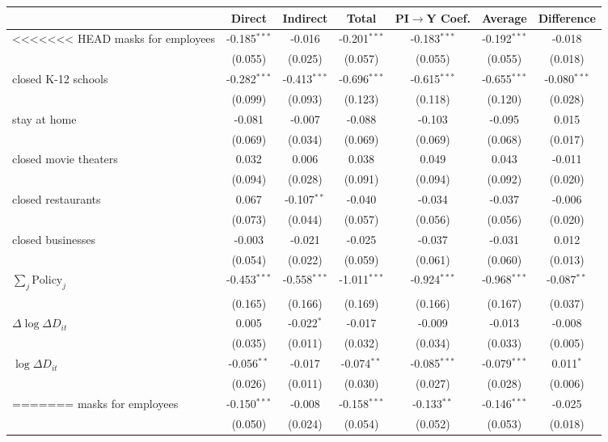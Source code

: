 
\begin{tabular}{lccccc|>{}c}
\toprule
  & Direct & Indirect & Total & PI$\to$Y Coef. & Average & Difference\\
\midrule
<<<<<<< HEAD
masks for employees & -0.185$^{***}$ & -0.016 & -0.201$^{***}$ & -0.183$^{***}$ & -0.192$^{***}$ & -0.018\\
 & (0.055) & (0.025) & (0.057) & (0.055) & (0.055) & (0.018)\\
closed K-12 schools & -0.282$^{***}$ & -0.413$^{***}$ & -0.696$^{***}$ & -0.615$^{***}$ & -0.655$^{***}$ & -0.080$^{***}$\\
 & (0.099) & (0.093) & (0.123) & (0.118) & (0.120) & (0.028)\\
stay at home & -0.081 & -0.007 & -0.088 & -0.103 & -0.095 & 0.015\\
 & (0.069) & (0.034) & (0.069) & (0.069) & (0.068) & (0.017)\\
closed movie theaters & 0.032 & 0.006 & 0.038 & 0.049 & 0.043 & -0.011\\
 & (0.094) & (0.028) & (0.091) & (0.094) & (0.092) & (0.020)\\
closed restaurants & 0.067 & -0.107$^{**}$ & -0.040 & -0.034 & -0.037 & -0.006\\
 & (0.073) & (0.044) & (0.057) & (0.056) & (0.056) & (0.020)\\
closed businesses & -0.003 & -0.021 & -0.025 & -0.037 & -0.031 & 0.012\\
 & (0.054) & (0.022) & (0.059) & (0.061) & (0.060) & (0.013)\\
$\sum_j \mathrm{Policy}_j$ & -0.453$^{***}$ & -0.558$^{***}$ & -1.011$^{***}$ & -0.924$^{***}$ & -0.968$^{***}$ & -0.087$^{**}$\\
 & (0.165) & (0.166) & (0.169) & (0.166) & (0.167) & (0.037)\\
$\Delta \log \Delta D_{it}$ & 0.005 & -0.022$^{*}$ & -0.017 & -0.009 & -0.013 & -0.008\\
 & (0.035) & (0.011) & (0.032) & (0.034) & (0.033) & (0.005)\\
$\log \Delta D_{it}$ & -0.056$^{**}$ & -0.017 & -0.074$^{**}$ & -0.085$^{***}$ & -0.079$^{***}$ & 0.011$^{*}$\\
 & (0.026) & (0.011) & (0.030) & (0.027) & (0.028) & (0.006)\\
=======
masks for employees & -0.150$^{***}$ & -0.008 & -0.158$^{***}$ & -0.133$^{**}$ & -0.146$^{***}$ & -0.025\\
 & (0.050) & (0.024) & (0.054) & (0.052) & (0.053) & (0.018)\\

\end{tabular}
